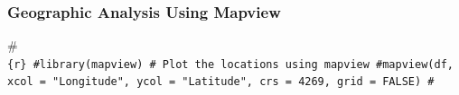 \documentclass[
]{article}
\begin{document}
\subsubsection{Geographic Analysis Using
Mapview}\label{geographic-analysis-using-mapview}

\#\texttt{\{r\}\ \#library(mapview)\ \#\ Plot\ the\ locations\ using\ mapview\ \#mapview(df,\ xcol\ =\ "Longitude",\ ycol\ =\ "Latitude",\ crs\ =\ 4269,\ grid\ =\ FALSE)\ \#}
\end{document}
